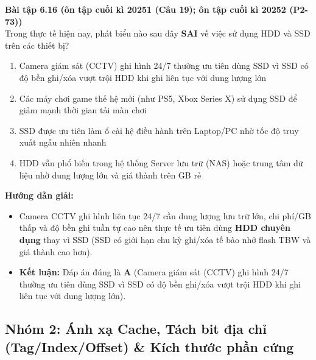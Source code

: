 \textbf{Bài tập 6.16 (ôn tập cuối kì 20251 (Câu 19); ôn tập cuối kì 20252 (P2-73))}\\
Trong thực tế hiện nay, phát biểu nào sau đây \textbf{SAI} về việc sử dụng HDD và SSD trên các thiết bị?
\begin{enumerate}[label=\Alph*.]
    \item Camera giám sát (CCTV) ghi hình 24/7 thường ưu tiên dùng SSD vì SSD có độ bền ghi/xóa vượt trội HDD khi ghi liên tục với dung lượng lớn
    \item Các máy chơi game thế hệ mới (như PS5, Xbox Series X) sử dụng SSD để giảm mạnh thời gian tải màn chơi
    \item SSD được ưu tiên làm ổ cài hệ điều hành trên Laptop/PC nhờ tốc độ truy xuất ngẫu nhiên nhanh
    \item HDD vẫn phổ biến trong hệ thống Server lưu trữ (NAS) hoặc trung tâm dữ liệu nhờ dung lượng lớn và giá thành trên GB rẻ
\end{enumerate}
\textbf{Hướng dẫn giải:}
\begin{itemize}
    \item Camera CCTV ghi hình liên tục 24/7 cần dung lượng lưu trữ lớn, chi phí/GB thấp và độ bền ghi tuần tự cao nên thực tế ưu tiên dùng \textbf{HDD chuyên dụng} thay vì SSD (SSD có giới hạn chu kỳ ghi/xóa tế bào nhớ flash TBW và giá thành cao hơn).
    \item \textbf{Kết luận:} Đáp án đúng là \textbf{A} (Camera giám sát (CCTV) ghi hình 24/7 thường ưu tiên dùng SSD vì SSD có độ bền ghi/xóa vượt trội HDD khi ghi liên tục với dung lượng lớn).
\end{itemize}

\subsection{Nhóm 2: Ánh xạ Cache, Tách bit địa chỉ (Tag/Index/Offset) \& Kích thước phần cứng}

